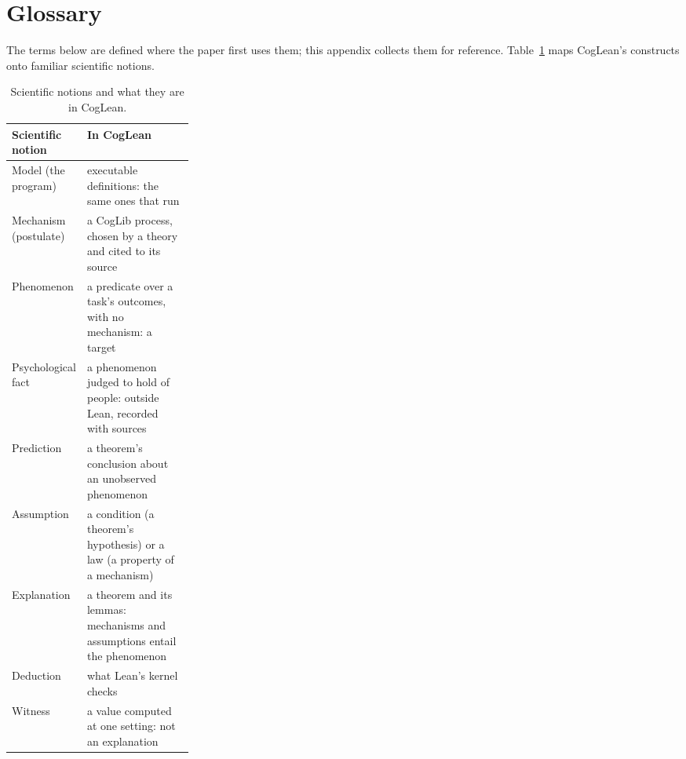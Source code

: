 \documentclass[11pt]{article}
\begin{document}
\section{Glossary}
\label{app:glossary}

The terms below are defined where the paper first uses them; this appendix collects them for reference. Table~\ref{tab:map} maps CogLean's constructs onto familiar scientific notions.

\begin{table}[h]
\centering\small
\begin{tabularx}{\linewidth}{@{}>{\raggedright\arraybackslash}p{0.27\linewidth}>{\raggedright\arraybackslash}X@{}}
\toprule
Scientific notion & In CogLean \\
\midrule
Model (the program) & executable definitions: the same ones that run \\
Mechanism (postulate) & a CogLib process, chosen by a theory and cited to its source \\
Phenomenon & a predicate over a task's outcomes, with no mechanism: a target \\
Psychological fact & a phenomenon judged to hold of people: outside Lean, recorded with sources \\
Prediction & a theorem's conclusion about an unobserved phenomenon \\
Assumption & a condition (a theorem's hypothesis) or a law (a property of a mechanism) \\
Explanation & a theorem and its lemmas: mechanisms and assumptions entail the phenomenon \\
Deduction & what Lean's kernel checks \\
Witness & a value computed at one setting: not an explanation \\
\bottomrule
\end{tabularx}
\caption{Scientific notions and what they are in CogLean.}
\label{tab:map}
\end{table}
\end{document}
